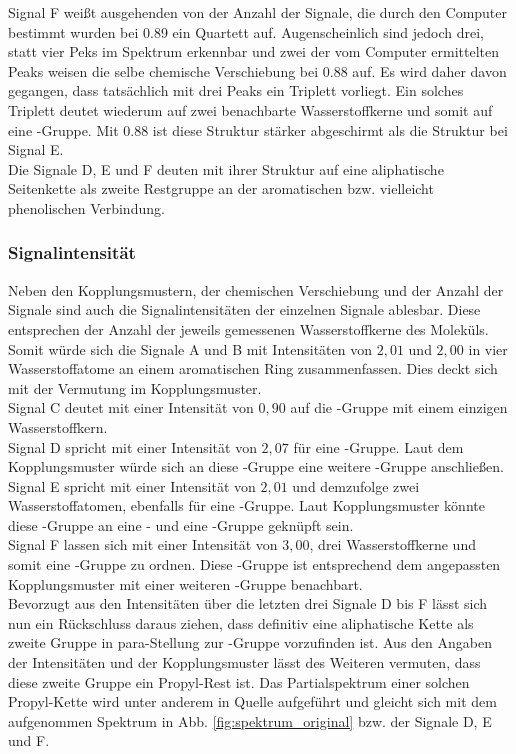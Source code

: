 Signal F weißt ausgehenden von der Anzahl der Signale, die durch den Computer bestimmt wurden bei \SI{0,89}{\ppm} ein Quartett auf. Augenscheinlich sind jedoch drei, statt vier Peks im Spektrum erkennbar und zwei der vom Computer ermittelten Peaks weisen die selbe chemische Verschiebung bei \SI{0,88}{\ppm} auf. Es wird daher davon gegangen, dass tatsächlich mit drei Peaks ein Triplett vorliegt. Ein solches Triplett deutet wiederum auf zwei benachbarte Wasserstoffkerne und somit auf eine -Gruppe. Mit \SI{0,88}{\ppm} ist diese Struktur stärker abgeschirmt als die Struktur bei Signal E.\\
Die Signale D, E und F deuten mit ihrer Struktur auf eine aliphatische Seitenkette als zweite Restgruppe an der aromatischen bzw. vielleicht phenolischen Verbindung.
\vspace*{-5mm}
\subsubsection*{Signalintensität}
Neben den Kopplungsmustern, der chemischen Verschiebung und der Anzahl der Signale sind auch die Signalintensitäten der einzelnen Signale ablesbar. Diese entsprechen der Anzahl der jeweils gemessenen Wasserstoffkerne des Moleküls.\\
Somit würde sich die Signale A und B mit Intensitäten von $2,01$ und $2,00$ in vier Wasserstoffatome an einem aromatischen Ring zusammenfassen. Dies deckt sich mit der Vermutung im Kopplungsmuster. \\
Signal C deutet mit einer Intensität von $0,90$ auf die -Gruppe mit einem  einzigen Wasserstoffkern.\\
 Signal D spricht mit einer Intensität von $2,07$ für eine -Gruppe. Laut dem Kopplungsmuster würde sich an diese -Gruppe eine weitere -Gruppe anschließen.\\
 Signal E spricht mit einer Intensität von $2,01$ und demzufolge zwei Wasserstoffatomen, ebenfalls für eine -Gruppe. Laut Kopplungsmuster könnte diese -Gruppe an eine - und eine -Gruppe geknüpft sein.\\
 Signal F lassen sich mit einer Intensität von $3,00$, drei Wasserstoffkerne und somit eine -Gruppe zu ordnen. Diese -Gruppe ist entsprechend dem angepassten Kopplungsmuster mit einer weiteren -Gruppe benachbart.\\
 Bevorzugt aus den Intensitäten über die letzten drei Signale D bis F lässt sich nun ein Rückschluss daraus ziehen, dass definitiv eine aliphatische Kette als zweite Gruppe in para-Stellung zur -Gruppe vorzufinden ist. Aus den Angaben der Intensitäten und der Kopplungsmuster lässt des Weiteren vermuten, dass diese zweite Gruppe ein Propyl-Rest ist. Das Partialspektrum einer solchen Propyl-Kette wird unter anderem in Quelle \cite[S. 17]{Breitmaier.2005} aufgeführt und gleicht sich mit dem aufgenommen Spektrum in Abb. \ref{fig:spektrum_original} bzw. der Signale D, E und F. 
 

